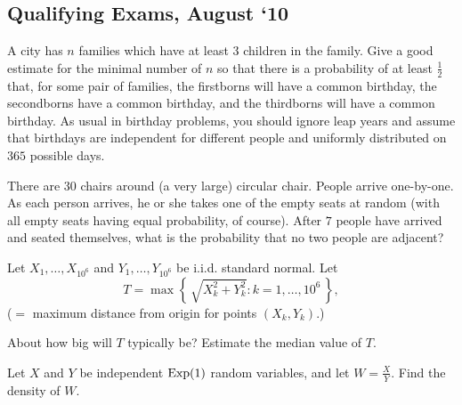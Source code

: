 \subsection{Qualifying Exams, August `10}
\begin{problem}
  A city has \(n\) families which have at least \(3\) children in the
  family. Give a good estimate for the minimal number of \(n\) so that
  there is a probability of at least \(\frac{1}{2}\) that, for some pair of
  families, the firstborns will have a common birthday, the secondborns
  have a common birthday, and the thirdborns will have a common
  birthday. As usual in birthday problems, you should ignore leap years and
  assume that birthdays are independent for different people and uniformly
  distributed on \(365\) possible days.
\end{problem}
\begin{solution*}
\end{solution*}

\begin{problem}
  There are \(30\) chairs around (a very large) circular chair. People
  arrive one-by-one. As each person arrives, he or she takes one of the
  empty seats at random (with all empty seats having equal probability, of
  course). After \(7\) people have arrived and seated themselves, what is
  the probability that no two people are adjacent?
\end{problem}
\begin{solution*}
\end{solution*}

\begin{problem}
  Let \(X_1,\dotsc,X_{10^6}\) and \(Y_1,\dotsc,Y_{10^6}\) be i.i.d.\@
  standard normal. Let
  \[
    T=\max\left\{\,\sqrt{X_k^2+Y_k^2}:k=1,\dotsc,10^6\,\right\},
  \]
  (\(=\) maximum distance from origin for points \((X_k,Y_k)\).)

  \noindent About how big will \(T\) typically be? Estimate the median
  value of \(T\).
\end{problem}
\begin{solution*}
\end{solution*}

\begin{problem}
  Let \(X\) and \(Y\) be independent \(\operatorname{Exp}(1)\) random variables, and let
  \(W=\frac{X}{Y}\). Find the density of \(W\).
\end{problem}
\begin{solution*}
\end{solution*}

